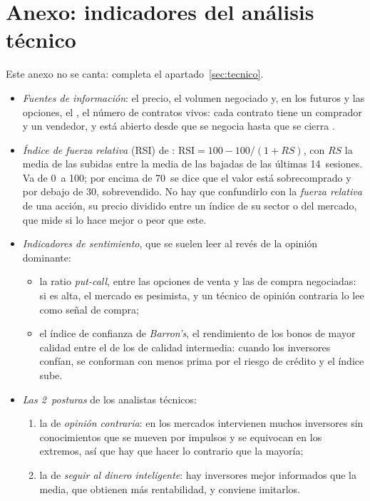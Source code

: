 \documentclass[11pt]{article}
\begin{document}
\section{Anexo: indicadores del análisis técnico}\label{anexo:indicadores}

Este anexo no se canta: completa el apartado~\ref{sec:tecnico}.

\begin{itemize}
\item \emph{Fuentes de información}: el precio, el volumen negociado y, en los futuros y las opciones, el , el número de contratos vivos: cada contrato tiene un comprador y un vendedor, y está abierto desde que se negocia hasta que se cierra .
\item \emph{Índice de fuerza relativa} (RSI) de \textcite{Wilder1978New}: $\mathrm{RSI}=100-100/(1+RS)$, con $RS$ la media de las subidas entre la media de las bajadas de las últimas 14~sesiones. Va de 0~a 100; por encima de 70~se dice que el valor está sobrecomprado y por debajo de 30, sobrevendido. No hay que confundirlo con la \emph{fuerza relativa} de una acción, su precio dividido entre un índice de su sector o del mercado, que mide si lo hace mejor o peor que este.
\item \emph{Indicadores de sentimiento}, que se suelen leer al revés de la opinión dominante:
  \begin{itemize}
  \item la ratio \emph{put-call}, entre las opciones de venta y las de compra negociadas: si es alta, el mercado es pesimista, y un técnico de opinión contraria lo lee como señal de compra;
  \item el índice de confianza de \emph{Barron's}, el rendimiento de los bonos de mayor calidad entre el de los de calidad intermedia: cuando los inversores confían, se conforman con menos prima por el riesgo de crédito y el índice sube\nocite{BodieKaneMarcus2021Investments}.
  \end{itemize}
\item \emph{Las 2~posturas} de los analistas técnicos:
  \begin{enumerate}
  \item la de \emph{opinión contraria}: en los mercados intervienen muchos inversores sin conocimientos que se mueven por impulsos y se equivocan en los extremos, así que hay que hacer lo contrario que la mayoría;
  \item la de \emph{seguir al dinero inteligente}: hay inversores mejor informados que la media, que obtienen más rentabilidad, y conviene imitarlos.
  \end{enumerate}
\end{itemize}
\end{document}
